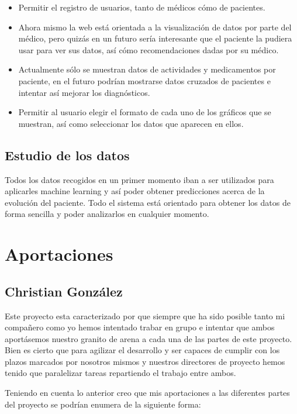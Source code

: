 \begin{itemize}
	\item Permitir el registro de usuarios, tanto de médicos cómo de pacientes.
    \item Ahora mismo la web está orientada a la visualización de datos por parte del médico, pero quizás en un futuro sería interesante que el paciente la pudiera usar para ver sus datos, así cómo recomendaciones dadas por su médico.
    \item Actualmente sólo se muestran datos de actividades y medicamentos por paciente, en el futuro podrían mostrarse datos cruzados de pacientes e intentar así mejorar los diagnósticos.
    \item Permitir al usuario elegir el formato de cada uno de los gráficos que se muestran, así como seleccionar los datos que aparecen en ellos.
\end{itemize}

\subsection{Estudio de los datos}
Todos los datos recogidos en un primer momento iban a ser utilizados para aplicarles machine learning y así poder obtener predicciones acerca de la evolución del paciente. Todo el sistema está orientado para obtener los datos de forma sencilla y poder analizarlos en cualquier momento.
\newpage

\section{Aportaciones}
\subsection{Christian González}

Este proyecto esta caracterizado por que siempre que ha sido posible tanto mi compañero como yo hemos intentado trabar en grupo e intentar que ambos aportásemos nuestro granito de arena a cada una de las partes de este proyecto. Bien es cierto que para agilizar el desarrollo y ser capaces de cumplir con los plazos marcados por nosotros mismos y nuestros directores de proyecto hemos tenido que paralelizar tareas repartiendo el trabajo entre ambos.

Teniendo en cuenta lo anterior creo que mis aportaciones a las diferentes partes del proyecto se podrían enumera de la siguiente forma:

